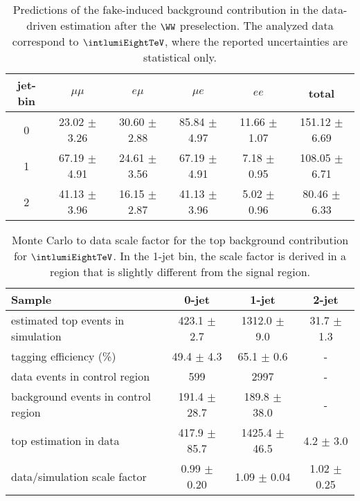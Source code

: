 \begin{table}[ht!]
\begin{center}
\begin{tabular}{c c c c c c} 
\hline
jet-bin &	 $\mu\mu$ &	 $e \mu$ &	 $\mu e$ &	 $ee$ &	 total \\ 
\hline
0 &  23.02 $\pm$	3.26   &  30.60 $\pm$   2.88     &  85.84 $\pm$   4.97  & 11.66 $\pm$   1.07  & 151.12 $\pm$   6.69 \\
1 &  67.19 $\pm$	4.91   &  24.61 $\pm$   3.56     &  67.19 $\pm$   4.91  &  7.18 $\pm$   0.95  & 108.05 $\pm$   6.71 \\ 
2 &  41.13 $\pm$	3.96   &  16.15 $\pm$   2.87     &  41.13 $\pm$   3.96  &  5.02 $\pm$   0.96  &  80.46 $\pm$   6.33 \\ 
\hline
\end{tabular}
\caption{Predictions of the fake-induced background contribution 
in the data-driven estimation after the $\WW$ preselection. 
The analyzed data correspond to $\intlumiEightTeV$, where the reported uncertainties are statistical only.}
\label{tab:fake_est}
\end{center}
\end{table}
\begin{table}[ht!]
\begin{center}
\begin{tabular}{l c c c}
\hline
                                   Sample & 0-jet           & 1-jet           & 2-jet       \\
\hline
estimated top events in simulation  & 423.1 $\pm$   2.7 &  1312.0 $\pm$   9.0 &  31.7 $\pm$   1.3 \\
tagging efficiency     (\%)         & 49.4 $\pm$  4.3 & 65.1 $\pm$  0.6 & - \\ 
data events in control region       &  599 & 2997 & - \\ 
background events in control region & 191.4 $\pm$  28.7 &  189.8 $\pm$  38.0 & - \\ 
top estimation in data              &  417.9 $\pm$  85.7 &  1425.4 $\pm$  46.5 &   4.2 $\pm$   3.0 \\
data/simulation scale factor        &   0.99 $\pm$  0.20 &   1.09 $\pm$  0.04 &  1.02 $\pm$  0.25 \\
\hline
\end{tabular}
\caption{Monte Carlo to data scale factor for the top background contribution for $\intlumiEightTeV$. 
In the 1-jet bin, the scale factor is derived in a region that is slightly different from the signal region.}
\label{tab:ttbar_est}
\end{center}
\end{table}


